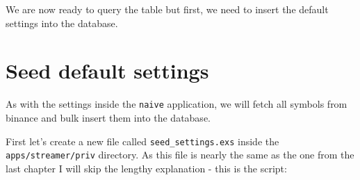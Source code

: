 \documentclass[
  oneside]{book}
\begin{document}
We are now ready to query the table but first, we need to insert the default settings into the database.

\section{Seed default settings}\label{seed-default-settings}

As with the settings inside the \texttt{naive} application, we will fetch all symbols from binance and bulk insert them into the database.

First let's create a new file called \texttt{seed\_settings.exs} inside the \texttt{apps/streamer/priv} directory. As this file is nearly the same as the one from the last chapter I will skip the lengthy explanation - this is the script:
\end{document}
